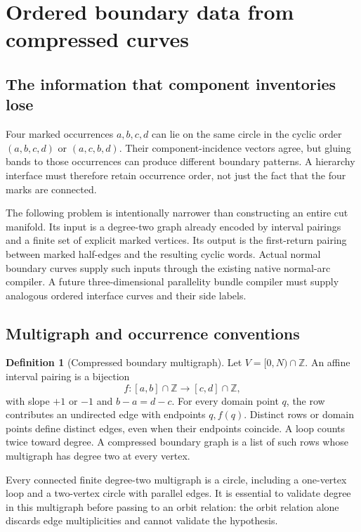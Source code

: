 \documentclass[11pt,letterpaper]{article}
\theoremstyle{definition}
\newtheorem{definition}[theorem]{Definition}
\theoremstyle{remark}
\newcommand{\Z}{\mathbb Z}
\begin{document}
\section{Ordered boundary data from compressed curves}
\label{sec:boundary}

\subsection{The information that component inventories lose}

Four marked occurrences $a,b,c,d$ can lie on the same circle in the cyclic
order $(a,b,c,d)$ or $(a,c,b,d)$. Their component-incidence vectors agree,
but gluing bands to those occurrences can produce different boundary
patterns. A hierarchy interface must therefore retain occurrence order,
not just the fact that the four marks are connected.

The following problem is intentionally narrower than constructing an
entire cut manifold. Its input is a degree-two graph already encoded by
interval pairings and a finite set of explicit marked vertices. Its output
is the first-return pairing between marked half-edges and the resulting
cyclic words. Actual normal boundary curves supply such inputs through the
existing native normal-arc compiler. A future three-dimensional parallelity
bundle compiler must supply analogous ordered interface curves and their
side labels.

\subsection{Multigraph and occurrence conventions}

\begin{definition}[Compressed boundary multigraph]
Let $V=[0,N)\cap\Z$. An affine interval pairing is a bijection
\[
 f:[a,b]\cap\Z\longrightarrow[c,d]\cap\Z,
\]
with slope $+1$ or $-1$ and $b-a=d-c$. For every domain point $q$,
the row contributes an undirected edge with endpoints $q,f(q)$. Distinct
rows or domain points define distinct edges, even when their endpoints
coincide. A loop counts twice toward degree. A compressed boundary graph
is a list of such rows whose multigraph has degree two at every vertex.
\end{definition}

Every connected finite degree-two multigraph is a circle, including a
one-vertex loop and a two-vertex circle with parallel edges. It is essential
to validate degree in this multigraph before passing to an orbit relation:
the orbit relation alone discards edge multiplicities and cannot validate
the hypothesis.
\end{document}
